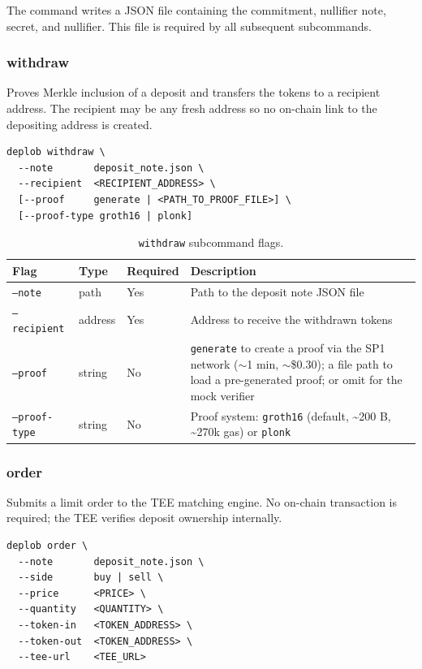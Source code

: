 \documentclass[12pt,a4paper]{article}
\begin{document}
\noindent The command writes a JSON file containing the commitment, nullifier note, secret, and nullifier.  This file is required by all subsequent subcommands.

\subsubsection{withdraw}

Proves Merkle inclusion of a deposit and transfers the tokens to a recipient address.  The recipient may be any fresh address so no on-chain link to the depositing address is created.

\begin{verbatim}
deplob withdraw \
  --note       deposit_note.json \
  --recipient  <RECIPIENT_ADDRESS> \
  [--proof     generate | <PATH_TO_PROOF_FILE>] \
  [--proof-type groth16 | plonk]
\end{verbatim}

\begin{table}[H]
\centering
\small
\begin{tabular}{|l|l|l|p{5cm}|}
\hline
\textbf{Flag} & \textbf{Type} & \textbf{Required} & \textbf{Description} \\
\hline
\texttt{--note} & path & Yes & Path to the deposit note JSON file \\
\hline
\texttt{--recipient} & address & Yes & Address to receive the withdrawn tokens \\
\hline
\texttt{--proof} & string & No & \texttt{generate} to create a proof via the SP1 network (${\sim}$1 min, ${\sim}$\$0.30); a file path to load a pre-generated proof; or omit for the mock verifier \\
\hline
\texttt{--proof-type} & string & No & Proof system: \texttt{groth16} (default, \textasciitilde{}200 B, \textasciitilde{}270k gas) or \texttt{plonk} \\
\hline
\end{tabular}
\caption{\texttt{withdraw} subcommand flags.}
\end{table}

\subsubsection{order}

Submits a limit order to the TEE matching engine.  No on-chain transaction is required; the TEE verifies deposit ownership internally.

\begin{verbatim}
deplob order \
  --note       deposit_note.json \
  --side       buy | sell \
  --price      <PRICE> \
  --quantity   <QUANTITY> \
  --token-in   <TOKEN_ADDRESS> \
  --token-out  <TOKEN_ADDRESS> \
  --tee-url    <TEE_URL>
\end{verbatim}
\end{document}
